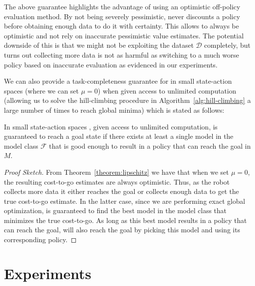 The above guarantee highlights the advantage of \taml{} using an
optimistic off-policy evaluation method. By not being severely
pessimistic, \taml{} never discounts a policy before obtaining enough
data to do it with certainty. This allows \taml{} to always be
optimistic and not rely on inaccurate pessimistic value estimates. The
potential downside of this is that we might not be exploiting the
dataset $\mathcal{D}$ completely, but turns out collecting more data
is not as harmful as switching to a much worse policy based on
inaccurate evaluation as evidenced in our experiments.

We can also provide a task-completeness guarantee for \taml{} in small
state-action spaces (where we can set $\mu = 0$) when given access to
unlimited computation (allowing us to solve the hill-climbing
procedure in Algorithm~\ref{alg:hill-climbing} a large number of times
to reach global minima) which is stated as follows:
\begin{theorem}
  In small state-action spaces \taml{}, given
  access to unlimited computation, is guaranteed to reach a goal state
  if there exists at least a single model in the model class
  $\mathcal{F}$ that is good enough to result in a policy that can
  reach the goal in $M$.
  \label{theorem:toms-completeness}
\end{theorem}
\begin{proof}[Proof Sketch]
  From Theorem~\ref{theorem:lipschitz} we have that when we set $\mu =
  0$, the resulting cost-to-go estimates are always optimistic. Thus,
  as the robot collects more data it either reaches the goal or
  collects enough data to get the true cost-to-go estimate. In the
  latter case, since we are performing exact global optimization,
  \taml{} is guaranteed to find the best model in the model class that
  minimizes the true cost-to-go. As long as this best model results in
  a policy that can reach the goal, \taml{} will also reach the goal
  by picking this model and using its corresponding policy.
\end{proof}

\section{Experiments}
\label{sec:experiments-1}

